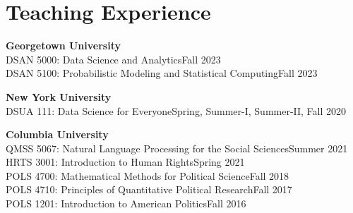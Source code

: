 \documentclass[letterpaper,11pt]{article}
\begin{document}
\vspace{5mm}
\noindent\begin{minipage}{\textwidth}
\section{Teaching Experience}

    \noindent\textbf{Georgetown University}\vspace{2mm}\\
                    DSAN 5000: Data Science and Analytics\hfill{}Fall 2023\vspace{1mm}\\            DSAN 5100: Probabilistic Modeling and Statistical Computing\hfill{}Fall 2023\vspace{2mm} \\    \end{minipage}
        \noindent\begin{minipage}{\textwidth}\noindent\textbf{New York University}\vspace{2mm}\\
                    DSUA 111: Data Science for Everyone\hfill{}Spring, Summer-I, Summer-II, Fall 2020\vspace{2mm} \\    \end{minipage}
        \noindent\begin{minipage}{\textwidth}\noindent\textbf{Columbia University}\vspace{2mm}\\
                    QMSS 5067: Natural Language Processing for the Social Sciences\hfill{}Summer 2021\vspace{1mm}\\            HRTS 3001: Introduction to Human Rights\hfill{}Spring 2021\vspace{1mm}\\            POLS 4700: Mathematical Methods for Political Science\hfill{}Fall 2018\vspace{1mm}\\            POLS 4710: Principles of Quantitative Political Research\hfill{}Fall 2017\vspace{1mm}\\            POLS 1201: Introduction to American Politics\hfill{}Fall 2016\vspace{2mm} \\    \end{minipage}
\end{document}

